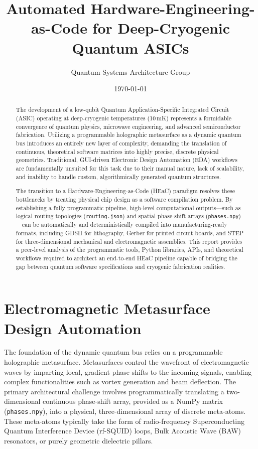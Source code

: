 \documentclass[11pt, a4paper]{article}
\title{\textbf{Automated Hardware-Engineering-as-Code for Deep-Cryogenic Quantum ASICs}}
\author{Quantum Systems Architecture Group}
\date{\today}
\begin{document}
\maketitle

\begin{abstract}
The development of a low-qubit Quantum Application-Specific Integrated Circuit (ASIC) operating at deep-cryogenic temperatures (10\,mK) represents a formidable convergence of quantum physics, microwave engineering, and advanced semiconductor fabrication. Utilizing a programmable holographic metasurface as a dynamic quantum bus introduces an entirely new layer of complexity, demanding the translation of continuous, theoretical software matrices into highly precise, discrete physical geometries. Traditional, GUI-driven Electronic Design Automation (EDA) workflows are fundamentally unsuited for this task due to their manual nature, lack of scalability, and inability to handle custom, algorithmically generated quantum structures.

The transition to a Hardware-Engineering-as-Code (HEaC) paradigm resolves these bottlenecks by treating physical chip design as a software compilation problem. By establishing a fully programmatic pipeline, high-level computational outputs---such as logical routing topologies (\texttt{routing.json}) and spatial phase-shift arrays (\texttt{phases.npy})---can be automatically and deterministically compiled into manufacturing-ready formats, including GDSII for lithography, Gerber for printed circuit boards, and STEP for three-dimensional mechanical and electromagnetic assemblies. This report provides a peer-level analysis of the programmatic tools, Python libraries, APIs, and theoretical workflows required to architect an end-to-end HEaC pipeline capable of bridging the gap between quantum software specifications and cryogenic fabrication realities.
\end{abstract}

\section{Electromagnetic Metasurface Design Automation}

The foundation of the dynamic quantum bus relies on a programmable holographic metasurface. Metasurfaces control the wavefront of electromagnetic waves by imparting local, gradient phase shifts to the incoming signals, enabling complex functionalities such as vortex generation and beam deflection. The primary architectural challenge involves programmatically translating a two-dimensional continuous phase-shift array, provided as a NumPy matrix (\texttt{phases.npy}), into a physical, three-dimensional array of discrete meta-atoms. These meta-atoms typically take the form of radio-frequency Superconducting Quantum Interference Device (rf-SQUID) loops, Bulk Acoustic Wave (BAW) resonators, or purely geometric dielectric pillars.
\end{document}
